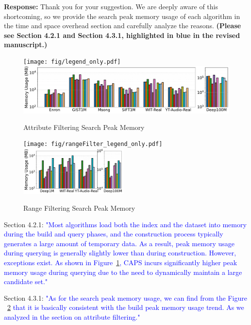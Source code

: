 \documentclass[sigconf, nonacm]{acmart}
\begin{document}
\noindent
\textbf{Response:} 
Thank you for your suggestion. We are deeply aware of this shortcoming, so we provide the search peak memory usage of each algorithm in the time and space overhead section and carefully analyze the reasons. \textbf{(Please see Section 4.2.1 and Section 4.3.1, highlighted in blue in the revised manuscript.)}
\begin{figure}[htbp]
	\centering
	\texttt{[image: fig/legend\_only.pdf]}
	\includegraphics[width=\linewidth]{fig/searchMem/label_memory_comparison.pdf}
	\caption{Attribute Filtering Search Peak Memory}
	\label{fig:search_memory_mb_comparison}
\end{figure}

\begin{figure}[htbp]
	\centering
	\texttt{[image: fig/rangeFilter\_legend\_only.pdf]}
	\includegraphics[height=2.5cm]{fig/searchMem/range_memory_comparison.pdf}
	\caption{Range Filtering Search Peak Memory}
	\label{fig:rangeFilter_search_memory_mb}
\end{figure}


Section 4.2.1:
\textcolor{blue}{"Most algorithms load both the index and the dataset into memory during the build and query phases, and the construction process typically generates a large amount of temporary data. As a result, peak memory usage during querying is generally slightly lower than during construction. However, exceptions exist. As shown in Figure~\ref{fig:search_memory_mb_comparison}, CAPS incurs significantly higher peak memory usage during querying due to the need to dynamically maintain a large candidate set."}

 Section 4.3.1:
\textcolor{blue}{"As for the search peak memory usage, we can find from the Figure ~\ref{fig:rangeFilter_search_memory_mb} that it is basically consistent with the build peak memory usage trend. As we analyzed in the section on attribute filtering."}
\end{document}
